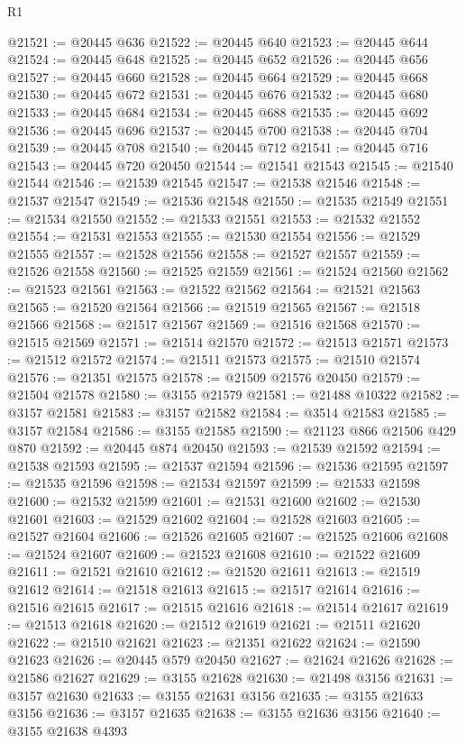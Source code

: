 \begin{lexlean}{R1}
\begin{coremodule}
@21521 := @20445 @636
@21522 := @20445 @640
@21523 := @20445 @644
@21524 := @20445 @648
@21525 := @20445 @652
@21526 := @20445 @656
@21527 := @20445 @660
@21528 := @20445 @664
@21529 := @20445 @668
@21530 := @20445 @672
@21531 := @20445 @676
@21532 := @20445 @680
@21533 := @20445 @684
@21534 := @20445 @688
@21535 := @20445 @692
@21536 := @20445 @696
@21537 := @20445 @700
@21538 := @20445 @704
@21539 := @20445 @708
@21540 := @20445 @712
@21541 := @20445 @716
@21543 := @20445 @720 @20450
@21544 := @21541 @21543
@21545 := @21540 @21544
@21546 := @21539 @21545
@21547 := @21538 @21546
@21548 := @21537 @21547
@21549 := @21536 @21548
@21550 := @21535 @21549
@21551 := @21534 @21550
@21552 := @21533 @21551
@21553 := @21532 @21552
@21554 := @21531 @21553
@21555 := @21530 @21554
@21556 := @21529 @21555
@21557 := @21528 @21556
@21558 := @21527 @21557
@21559 := @21526 @21558
@21560 := @21525 @21559
@21561 := @21524 @21560
@21562 := @21523 @21561
@21563 := @21522 @21562
@21564 := @21521 @21563
@21565 := @21520 @21564
@21566 := @21519 @21565
@21567 := @21518 @21566
@21568 := @21517 @21567
@21569 := @21516 @21568
@21570 := @21515 @21569
@21571 := @21514 @21570
@21572 := @21513 @21571
@21573 := @21512 @21572
@21574 := @21511 @21573
@21575 := @21510 @21574
@21576 := @21351 @21575
@21578 := @21509 @21576 @20450
@21579 := @21504 @21578
@21580 := @3155 @21579
@21581 := @21488 @10322
@21582 := @3157 @21581
@21583 := @3157 @21582
@21584 := @3514 @21583
@21585 := @3157 @21584
@21586 := @3155 @21585
@21590 := @21123 @866 @21506 @429 @870
@21592 := @20445 @874 @20450
@21593 := @21539 @21592
@21594 := @21538 @21593
@21595 := @21537 @21594
@21596 := @21536 @21595
@21597 := @21535 @21596
@21598 := @21534 @21597
@21599 := @21533 @21598
@21600 := @21532 @21599
@21601 := @21531 @21600
@21602 := @21530 @21601
@21603 := @21529 @21602
@21604 := @21528 @21603
@21605 := @21527 @21604
@21606 := @21526 @21605
@21607 := @21525 @21606
@21608 := @21524 @21607
@21609 := @21523 @21608
@21610 := @21522 @21609
@21611 := @21521 @21610
@21612 := @21520 @21611
@21613 := @21519 @21612
@21614 := @21518 @21613
@21615 := @21517 @21614
@21616 := @21516 @21615
@21617 := @21515 @21616
@21618 := @21514 @21617
@21619 := @21513 @21618
@21620 := @21512 @21619
@21621 := @21511 @21620
@21622 := @21510 @21621
@21623 := @21351 @21622
@21624 := @21590 @21623
@21626 := @20445 @579 @20450
@21627 := @21624 @21626
@21628 := @21586 @21627
@21629 := @3155 @21628
@21630 := @21498 @3156
@21631 := @3157 @21630
@21633 := @3155 @21631 @3156
@21635 := @3155 @21633 @3156
@21636 := @3157 @21635
@21638 := @3155 @21636 @3156
@21640 := @3155 @21638 @4393

\end{coremodule}
\end{lexlean}
